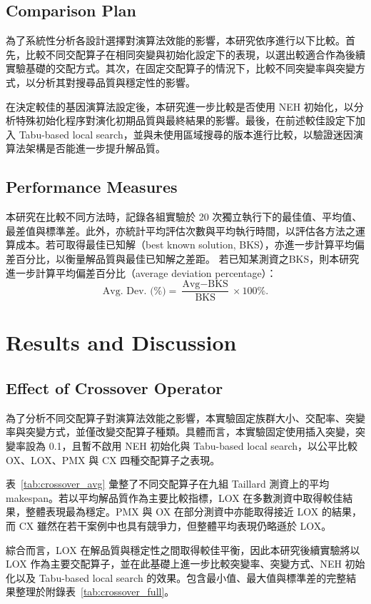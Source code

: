 \documentclass[conference]{IEEEtran}
\begin{document}
\subsection{Comparison Plan}

為了系統性分析各設計選擇對演算法效能的影響，本研究依序進行以下比較。首先，比較不同交配算子在相同突變與初始化設定下的表現，以選出較適合作為後續實驗基礎的交配方式。其次，在固定交配算子的情況下，比較不同突變率與突變方式，以分析其對搜尋品質與穩定性的影響。

在決定較佳的基因演算法設定後，本研究進一步比較是否使用 NEH 初始化，以分析特殊初始化程序對演化初期品質與最終結果的影響。最後，在前述較佳設定下加入 Tabu-based local search，並與未使用區域搜尋的版本進行比較，以驗證迷因演算法架構是否能進一步提升解品質。

\subsection{Performance Measures}

本研究在比較不同方法時，記錄各組實驗於 20 次獨立執行下的最佳值、平均值、最差值與標準差。此外，亦統計平均評估次數與平均執行時間，以評估各方法之運算成本。若可取得最佳已知解（best known solution, BKS），亦進一步計算平均偏差百分比，以衡量解品質與最佳已知解之差距。
若已知某測資之BKS，則本研究進一步計算平均偏差百分比（average deviation percentage）：
\[\text{Avg. Dev. (\%)} = \frac{\text{Avg} - \text{BKS}}{\text{BKS}} \times 100\%.\]\par

\section{Results and Discussion}
\subsection{Effect of Crossover Operator}
為了分析不同交配算子對演算法效能之影響，本實驗固定族群大小、交配率、突變率與突變方式，並僅改變交配算子種類。具體而言，本實驗固定使用插入突變，突變率設為 0.1，且暫不啟用 NEH 初始化與 Tabu-based local search，以公平比較 OX、LOX、PMX 與 CX 四種交配算子之表現。

表~\ref{tab:crossover_avg} 彙整了不同交配算子在九組 Taillard 測資上的平均 makespan。若以平均解品質作為主要比較指標，LOX 在多數測資中取得較佳結果，整體表現最為穩定。PMX 與 OX 在部分測資中亦能取得接近 LOX 的結果，而 CX 雖然在若干案例中也具有競爭力，但整體平均表現仍略遜於 LOX。

綜合而言，LOX 在解品質與穩定性之間取得較佳平衡，因此本研究後續實驗將以 LOX 作為主要交配算子，並在此基礎上進一步比較突變率、突變方式、NEH 初始化以及 Tabu-based local search 的效果。包含最小值、最大值與標準差的完整結果整理於附錄表~\ref{tab:crossover_full}。
\end{document}
